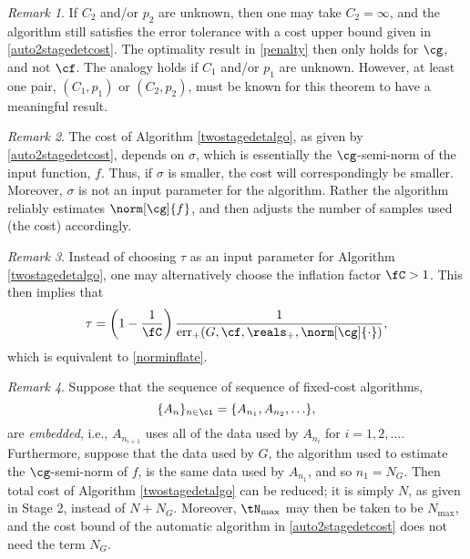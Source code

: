 \documentclass[final]{elsarticle}
\DeclareMathOperator{\err}{err}
\theoremstyle{definition}
\theoremstyle{remark}
\newtheorem{rem}{Remark}
\begin{document}
\begin{rem} If $C_2$ and/or $p_2$ are unknown, then one may take $C_2=\infty$, and the algorithm still satisfies the error tolerance with a cost upper bound given in \eqref{auto2stagedetcost}.  The optimality result in \eqref{penalty} then only holds for $\cg$, and not $\cf$.  The analogy holds if $C_1$ and/or $p_1$ are unknown.  However, at least one pair, $(C_1,p_1)$ or $(C_2,p_2)$, must be known for this theorem to have a meaningful result.
\end{rem}

\begin{rem} The cost of Algorithm \ref{twostagedetalgo}, as given by \eqref{auto2stagedetcost}, depends on $\sigma$, which is essentially the $\cg$-semi-norm of the input function, $f$.  Thus, if $\sigma$ is smaller, the cost will correspondingly be smaller.  Moreover, $\sigma$ is not an input parameter for the algorithm.  Rather the algorithm reliably estimates $\norm[\cg]{f}$, and then adjusts the number of samples used (the cost) accordingly.
\end{rem}

\begin{rem} Instead of choosing $\tau$ as an input parameter for Algorithm \ref{twostagedetalgo}, one may alternatively choose the inflation factor $\fC >1$.  This then implies that 
\begin{equation}
\tau = \left(1 - \frac{1}{\fC}\right)\frac{1}{\err_{+}(G,\cf,\reals_+,\norm[\cg]{\cdot})},
\end{equation}
which is equivalent to \eqref{norminflate}.
\end{rem}

\begin{rem} Suppose that the sequence of sequence of fixed-cost algorithms, 
\[
\{A_n\}_{n \in \ci} = \{A_{n_1}, A_{n_2}, \ldots \}, 
\]
are \emph{embedded}, i.e., $A_{n_{i+1}}$ uses all of the data used by $A_{n_{i}}$ for $i=1, 2, \ldots$.  Furthermore, suppose that the data used by $G$, the algorithm used to estimate the $\cg$-semi-norm of $f$, is the same data used by $A_{n_1}$, and so $n_1=N_G$.  Then total cost of Algorithm \ref{twostagedetalgo} can be reduced; it is simply $N$, as given in Stage 2, instead of $N+N_G$.  Moreover, $\tN_{\max}$ may then be taken to be $N_{\max}$, and the cost bound of the automatic algorithm in \eqref{auto2stagedetcost} does not need the term $N_G$.
\end{rem}
\end{document}
